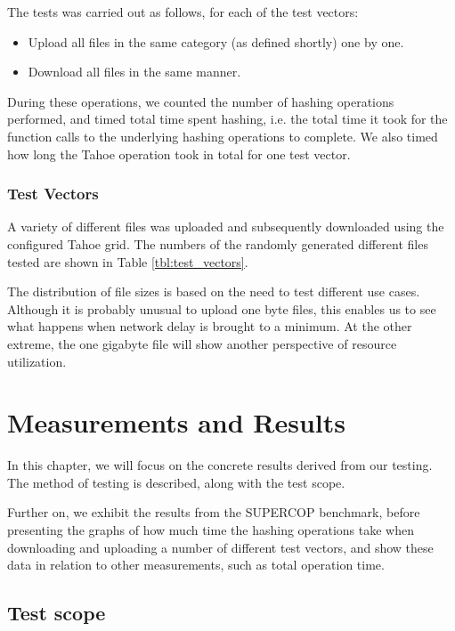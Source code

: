\documentclass[english,12pt,a4paper]{book}
\begin{document}
The tests was carried out as follows, for each of the test vectors:

\begin{itemize}
  \item Upload all files in the same category (as defined shortly) one by one.
  \item Download all files in the same manner.
\end{itemize}

During these operations, we counted the number of hashing operations performed,
and timed total time spent hashing, i.e. the total time it took for the function
calls to the underlying hashing operations to complete. We also timed how long
the Tahoe operation took in total for one test vector.

\subsection{Test Vectors}

A variety of different files was uploaded and subsequently downloaded using the
configured Tahoe grid. The numbers of the randomly generated different files
tested are shown in Table \ref{tbl:test_vectors}.



The distribution of file sizes is based on the need to test different use cases.
Although it is probably unusual to upload one byte files, this enables us to see
what happens when network delay is brought to a minimum. At the other extreme,
the one gigabyte file will show another perspective of resource utilization.

\chapter{Measurements and Results}

In this chapter, we will focus on the concrete results derived from our testing.
The method of testing is described, along with the test scope.

Further on, we exhibit the results from the \ac{SUPERCOP} benchmark, before
presenting the graphs of how much time the hashing operations take when
downloading and uploading a number of different test vectors, and show these
data in relation to other measurements, such as total operation time.

\section{Test scope}
\end{document}
